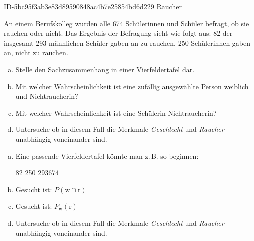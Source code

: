 \begin{exercise}
      {ID-5bc95f3ab3e83d89590848ac4b7e25854bd6d229}
      {Raucher}
  \ifproblem\problem\par
    An einem Berufskolleg wurden alle \num{674}
    Schülerinnen und Schüler befragt, ob sie
    rauchen oder nicht. Das Ergebnis der Befragung
    sieht wie folgt aus: \num{82} der insgesamt
    \num{293} männlichen Schüler gaben an zu
    rauchen. \num{250} Schülerinnen gaben an,
    nicht zu rauchen.
    \begin{enumerate}[a)]
      \item Stelle den Sachzusammenhang in einer
            Vierfeldertafel dar.
      \item Mit welcher Wahrscheinlichkeit ist eine
            zufällig ausgewählte Person weiblich
            und Nichtraucherin?
      \item Mit welcher Wahrscheinlichkeit ist eine
            Schülerin Nichtraucherin?
      \item Untersuche ob in diesem Fall die
            Merkmale \emph{Geschlecht} und
            \emph{Raucher} unabhängig voneinander
            sind.
    \end{enumerate}
  \fi
  \ifoutline\outline
    \begin{enumerate}[a)]
      \item Eine passende Vierfeldertafel könnte man z.\,B. so beginnen:
            \begin{center}
              \begin{fourfoldtable}
                \numbers
                {82}{}{}
                {}{250}{}
                {293}{}{674}
              \end{fourfoldtable}
            \end{center}
      \item Gesucht ist: $P(\text{w}\cap\overline{\text{r}})$
      \item Gesucht ist: $P_{\text{w}}(\overline{\text{r}})$
      \item Untersuche ob in diesem Fall die Merkmale \emph{Geschlecht}
            und \emph{Raucher} unabhängig voneinander sind.
    \end{enumerate}
  \fi
\end{exercise}


